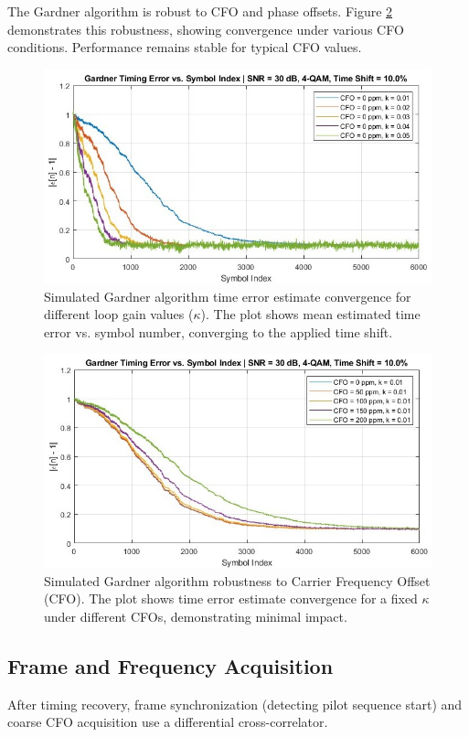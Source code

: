 \documentclass[11pt]{article}
\begin{document}
	The Gardner algorithm is robust to CFO and phase offsets. Figure \ref{fig:gardner2} demonstrates this robustness, showing convergence under various CFO conditions. Performance remains stable for typical CFO values.
	
	\begin{figure}[H]
		\centering
		\includegraphics[width=0.7\linewidth]{Images/Gardner_k_list.jpg} 
		\caption{Simulated Gardner algorithm time error estimate convergence for different loop gain values ($\kappa$). The plot shows mean estimated time error vs. symbol number, converging to the applied time shift.}
		\label{fig:gardner1}
	\end{figure}
	
	\begin{figure}[H]
		\centering
		\includegraphics[width=0.7\linewidth]{Images/Gardner_CFO_robust.jpg} 
		\caption{Simulated Gardner algorithm robustness to Carrier Frequency Offset (CFO). The plot shows time error estimate convergence for a fixed $\kappa$ under different CFOs, demonstrating minimal impact.}
		\label{fig:gardner2}
	\end{figure}
	
	\subsection{Frame and Frequency Acquisition}
	After timing recovery, frame synchronization (detecting pilot sequence start) and coarse CFO acquisition use a differential cross-correlator.
	
\end{document}
